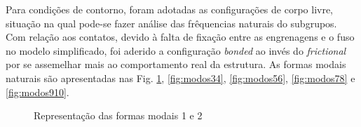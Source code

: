 Para condições de contorno, foram adotadas as configurações de corpo livre, situação na qual pode-se fazer análise das frêquencias naturais do subgrupos. Com relação aos contatos, devido à falta de fixação entre as engrenagens e o fuso no modelo simplificado, foi aderido a configuração \textit{bonded} ao invés do \textit{frictional} por se assemelhar mais ao comportamento real da estrutura.
As formas modais naturais são apresentadas nas Fig. \ref{fig:modos12}, \ref{fig:modos34}, \ref{fig:modos56}, \ref{fig:modos78} e \ref{fig:modos910}.

\begin{figure}[H]
\centering
{}\hfill
{}\par 
\caption{Representação das formas modais 1 e 2}
\label{fig:modos12}
\end{figure}

